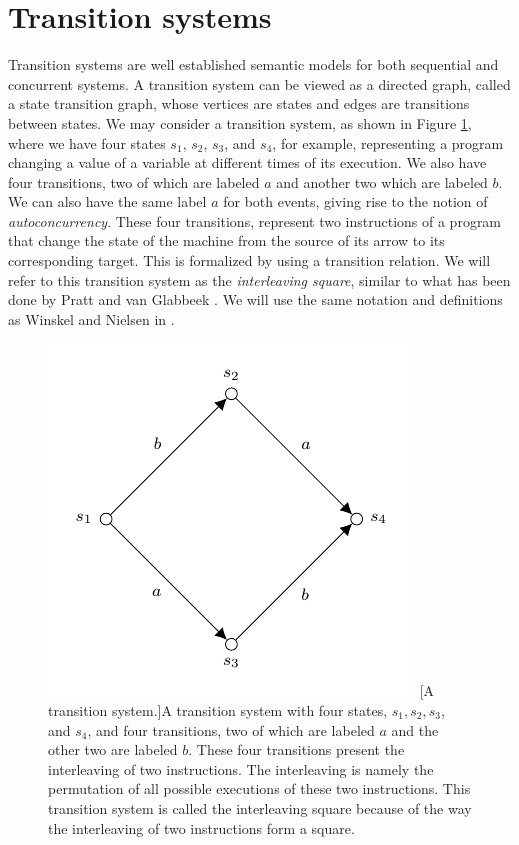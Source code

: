 \section{Transition systems}
\label{sec:ordinary-transition-systems}
    Transition systems are well established semantic models for both sequential and concurrent systems. A transition system can be viewed as a directed graph, called a state transition graph, whose vertices are states and edges are transitions between states. We may consider a transition system, as shown in Figure \ref{fig:transition-system}, where we have four states $s_{1}$, $s_{2}$, $s_{3}$, and $s_{4}$, for example, representing a program changing a value of a variable at different times of its execution. We also have four transitions, two of which are labeled $a$ and another two which are labeled $b$. We can also have the same label $a$ for both events, giving rise to the notion of \emph{autoconcurrency}. These four transitions, represent two instructions of a program that change the state of the machine from the source of its arrow to its corresponding target. This is formalized by using a transition relation. We will refer to this transition system as the \emph{interleaving square}, similar to what has been done by Pratt \cite{Pratt00Sculptures} and van Glabbeek \cite{Glabbeek06HDA}. We will use the same notation and definitions as Winskel and Nielsen in \cite{winskel95modelsCategory}.
    
    \begin{figure}[ht]
        \centering
        \includegraphics[scale=1.1]{Figures/2.Models-for-concurrency/transition-system.pdf}
        [A transition system.]{A transition system with four states, $s_{1}, s_{2}, s_{3}$, and $s_{4}$, and four transitions, two of which are labeled $a$ and the other two are labeled $b$. These four transitions present the interleaving of two instructions. The interleaving is namely the permutation of all possible executions of these two instructions. This transition system is called the interleaving square because of the way the interleaving of two instructions form a square.}
        \label{fig:transition-system}
      
    \end{figure}
    
